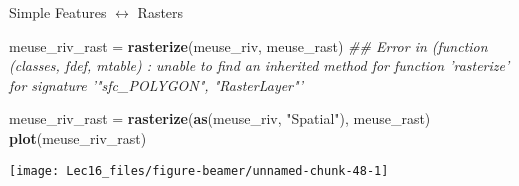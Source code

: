 \documentclass[11pt,ignorenonframetext,]{beamer}
\newenvironment{Shaded}{}{}
\newcommand{\CommentTok}[1]{\textcolor[rgb]{0.38,0.63,0.69}{\textit{#1}}}
\newcommand{\KeywordTok}[1]{\textcolor[rgb]{0.00,0.44,0.13}{\textbf{#1}}}
\newcommand{\NormalTok}[1]{#1}
\newcommand{\StringTok}[1]{\textcolor[rgb]{0.25,0.44,0.63}{#1}}
\let\oldShaded\Shaded
\let\endoldShaded\endShaded
\renewenvironment{Shaded}{\footnotesize\begin{spacing}{0.9}\oldShaded}{\endoldShaded\end{spacing}}
\let\oldverbatim\verbatim
\let\endoldverbatim\endverbatim
\newcommand{\scriptoutput}{
  \renewenvironment{Shaded}{\scriptsize\begin{spacing}{0.9}\oldShaded}{\endoldShaded\end{spacing}}
  \renewenvironment{verbatim}{\scriptsize\begin{spacing}{0.9}\oldverbatim}{\endoldverbatim\end{spacing}}
}
\begin{document}
\begin{frame}[fragile,t]{Simple Features \(\longleftrightarrow\)
Rasters}
\protect\hypertarget{simple-features-longleftrightarrow-rasters}{}

\scriptoutput

\begin{Shaded}
\begin{Highlighting}[]
\NormalTok{meuse_riv_rast =}\StringTok{ }\KeywordTok{rasterize}\NormalTok{(meuse_riv, meuse_rast)}
\CommentTok{## Error in (function (classes, fdef, mtable) : unable to find an inherited method for function 'rasterize' for signature '"sfc_POLYGON", "RasterLayer"'}

\NormalTok{meuse_riv_rast =}\StringTok{ }\KeywordTok{rasterize}\NormalTok{(}\KeywordTok{as}\NormalTok{(meuse_riv, }\StringTok{"Spatial"}\NormalTok{), meuse_rast)}
\KeywordTok{plot}\NormalTok{(meuse_riv_rast)}
\end{Highlighting}
\end{Shaded}

\begin{center}\texttt{[image: Lec16\_files/figure-beamer/unnamed-chunk-48-1]} \end{center}

\end{frame}
\end{document}
